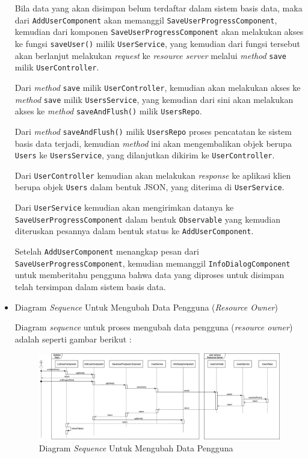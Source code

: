 \documentclass[pdftex,12pt, oneside]{article}
\begin{document}
\begin{itemize}
		Bila data yang akan disimpan belum terdaftar dalam sistem basis data, maka dari \texttt{AddUserComponent} akan memanggil \texttt{SaveUserProgressComponent}, kemudian dari komponen \texttt{SaveUserProgressComponent} akan melakukan akses ke fungsi \texttt{saveUser()} milik \texttt{UserService}, yang kemudian dari fungsi tersebut akan berlanjut melakukan \textit{request} ke \textit{resource server} melalui \textit{method} \texttt{save} milik \texttt{UserController}.
		
		Dari \textit{method} \texttt{save} milik \texttt{UserController}, kemudian akan melakukan akses ke \textit{method} \texttt{save} milik \texttt{UsersService}, yang kemudian dari sini akan melakukan akses ke \textit{method} \texttt{saveAndFlush()} milik \texttt{UsersRepo}.
		
		Dari \textit{method} \texttt{saveAndFlush()} milik \texttt{UsersRepo} proses pencatatan ke sistem basis data terjadi, kemudian \textit{method} ini akan mengembalikan objek berupa \texttt{Users} ke \texttt{UsersService}, yang dilanjutkan dikirim ke \texttt{UserController}.
		
		Dari \texttt{UserController} kemudian akan melakukan \textit{response} ke aplikasi klien berupa objek \texttt{Users} dalam bentuk JSON, yang diterima di \texttt{UserService}.
		
		Dari \texttt{UserService} kemudian akan mengirimkan datanya ke \texttt{SaveUserProgressComponent} dalam bentuk \texttt{Observable} yang kemudian diteruskan pesannya dalam bentuk status ke \texttt{AddUserComponent}.
		
		Setelah \texttt{AddUserComponent} menangkap pesan dari \texttt{SaveUserProgressComponent}, kemudian memanggil \texttt{InfoDialogComponent} untuk memberitahu pengguna bahwa data yang diproses untuk disimpan telah tersimpan dalam sistem basis data.
	
	\item Diagram \textit{Sequence} Untuk Mengubah Data Pengguna (\textit{Resource Owner})
	
	Diagram \textit{sequence} untuk proses mengubah data pengguna (\textit{resource owner}) adalah seperti gambar berikut :
	
	\begin{figure}[H]
		\centering
		\includegraphics[width=1\textwidth]{./resources/seq-edit-user}
		\caption{Diagram \textit{Sequence} Untuk Mengubah Data Pengguna}
		\label{fig:seq-edit-user}
	\end{figure}	
	

\end{itemize}
\end{document}
